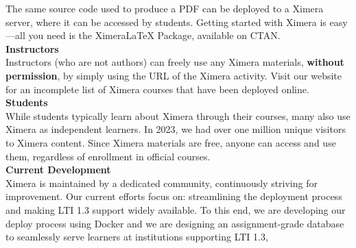 \documentclass{article}
\begin{document}
\begin{multicols}{2}
\begin{center}
\begin{tikzpicture}
        \end{tikzpicture}
    \end{center}
    The same source code used to produce a PDF can be deployed to a Ximera
    server, where it can be accessed by students. Getting started with Ximera
    is
    easy---all you need is the XimeraLaTeX Package, available on CTAN.
    \\[.5cm]
    {\sffamily\bfseries Instructors}\\
    Instructors (who are not authors) can freely use any Ximera materials,
    \textbf{without permission}, by simply using the URL of the Ximera
    activity. Visit our website for an incomplete list of Ximera courses that
    have
    been deployed online.
    \\[.5cm]%
    {\sffamily\bfseries Students}\\
    While students typically learn about Ximera through their courses, many
    also use Ximera as independent learners. In 2023, we had over one million unique visitors to Ximera content. Since Ximera materials are free,
    anyone can access and use them, regardless of enrollment in official courses.
    \\[.5cm]
    {\sffamily\bfseries Current Development}\\
    Ximera is maintained by a dedicated community, continuously striving for
    improvement. Our current efforts focus on: streamlining the deployment
    process and   making LTI 1.3 support widely available. To this end, we are
    developing our
    deploy process using Docker and we are designing an assignment-grade database
    to
    seamlessly serve  learners at institutions supporting LTI 1.3,
    \begin{center}
\end{center}
\end{multicols}
\end{document}
